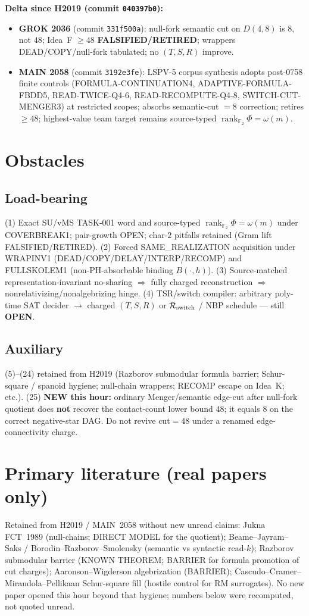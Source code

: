 \documentclass[11pt]{article}
\begin{document}
\textbf{Delta since H2019 (commit \texttt{040397b0}):}
\begin{itemize}
\item \textbf{GROK 2036} (commit \texttt{331f500a}): null-fork semantic cut on $D(4,8)$ is $8$, not $48$;
  Idea~F $\ge48$ \textbf{FALSIFIED/RETIRED}; wrappers DEAD/COPY/null-fork tabulated; no $(T,S,R)$ improve.
\item \textbf{MAIN 2058} (commit \texttt{3192e3fe}): LSPV-5 corpus synthesis adopts post-0758 finite
  controls (FORMULA-CONTINUATION4, ADAPTIVE-FORMULA-FBDD5, READ-TWICE-Q4-6, READ-RECOMPUTE-Q4-8,
  SWITCH-CUT-MENGER3) at restricted scopes; absorbs semantic-cut $=8$ correction; retires $\ge48$;
  highest-value team target remains source-typed $\operatorname{rank}_{\mathbb F_2}\Phi=\omega(m)$.
\end{itemize}

\section*{Obstacles}
\subsection*{Load-bearing}
(1) Exact SU/vMS TASK-001 word and source-typed
$\operatorname{rank}_{\mathbb F_2}\Phi=\omega(m)$ under COVERBREAK1; pair-growth OPEN;
char-$2$ pitfalls retained (Gram lift FALSIFIED/RETIRED).
(2) Forced SAME\_REALIZATION acquisition under WRAPINV1
(DEAD/COPY/DELAY/INTERP/RECOMP) and FULLSKOLEM1 (non-PH-absorbable binding $B(\cdot,h)$).
(3) Source-matched representation-invariant no-sharing $\Rightarrow$ fully charged reconstruction
$\Rightarrow$ nonrelativizing/nonalgebrizing hinge.
(4) TSR/switch compiler: arbitrary poly-time SAT decider $\to$ charged $(T,S,R)$ or
$\mathcal R_{\rm switch}$ / NBP schedule --- still \textbf{OPEN}.

\subsection*{Auxiliary}
(5)--(24) retained from H2019 (Razborov submodular formula barrier; Schur-square /
spanoid hygiene; null-chain wrappers; RECOMP escape on Idea~K; etc.).
(25) \textbf{NEW this hour:} ordinary Menger/semantic edge-cut after null-fork quotient
does \textbf{not} recover the contact-count lower bound $48$; it equals $8$ on the
correct negative-star DAG. Do not revive cut$=48$ under a renamed edge-connectivity charge.

\section*{Primary literature (real papers only)}
Retained from H2019 / MAIN~2058 without new unread claims:
Jukna FCT~1989 (null-chains; DIRECT MODEL for the quotient);
Beame--Jayram--Saks / Borodin--Razborov--Smolensky (semantic vs syntactic read-$k$);
Razborov submodular barrier (KNOWN THEOREM; BARRIER for formula promotion of cut charges);
Aaronson--Wigderson algebrization (BARRIER);
Cascudo--Cramer--Mirandola--Pellikaan Schur-square fill (hostile control for RM surrogates).
No new paper opened this hour beyond that hygiene; numbers below were recomputed, not quoted unread.
\end{document}
